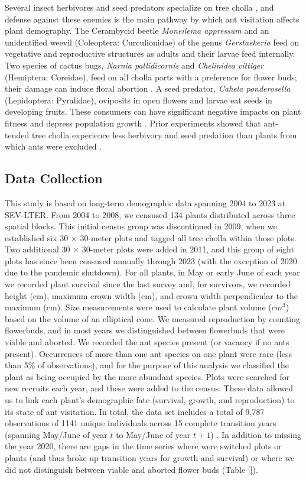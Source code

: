 \documentclass[11pt]{article}
\begin{document}
Several insect herbivores and seed predators specialize on tree cholla \citep{Mann1969}, and defense against these enemies is the main pathway by which ant visitation affects plant demography. 
The Cerambycid beetle \textit{Moneilema appressum} and an unidentified weevil (Coleoptera: Curculionidae) of the genus \textit{Gerstaekeria} feed on vegetative and reproductive structures as adults and their larvae feed internally. 
Two species of cactus bugs, \textit{Narnia pallidicornis} and \textit{Chelinidea vittiger} (Hemiptera: Coreidae), feed on all cholla parts with a preference for flower buds; their damage can induce floral abortion \citep{Miller2006}. 
A seed predator, \textit{Cahela ponderosella} (Lepidoptera: Pyralidae), oviposits in open flowers and larvae eat seeds in developing fruits. 
These consumers can have significant negative impacts on plant fitness and depress population growth \citep{Miller2009}.
Prior experiments showed that ant-tended tree cholla experience less herbivory and seed predation than plants from which ants were excluded \citep{Miller2007,Ohm2014}. 

\subsection*{Data Collection}
This study is based on long-term demographic data spanning 2004 to 2023 at SEV-LTER. 
From 2004 to 2008, we censused 134 plants distributed across three spatial blocks. 
This initial census group was discontinued in 2009, when we established six 30 $\times$ 30-meter plots and tagged all tree cholla within those plots. 
Two additional 30 $\times$ 30-meter plots were added in 2011, and this group of eight plots has since been censused annually through 2023 (with the exception of 2020 due to the pandemic shutdown). 
For all plants, in May or early June of each year we recorded plant survival since the last survey and, for survivors, we recorded height (cm), maximum crown width (cm), and crown width perpendicular to the maximum (cm).
Size measurements were used to calculate plant volume ($cm^3$) based on the volume of an elliptical cone. 
We measured reproduction by counting flowerbuds, and in most years we distinguished between flowerbuds that were viable and aborted. 
We recorded the ant species present (or vacancy if no ants present).
Occurrences of more than one ant species on one plant were rare (less than 5\% of observations), and for the purpose of this analysis we classified the plant as being occupied by the more abundant species. 
Plots were searched for new recruits each year, and these were added to the census.
These data allowed us to link each plant's demographic fate (survival, growth, and reproduction) to its state of ant visitation. 
In total, the data set includes a total of 9,787 observations of 1141 unique individuals across 15 complete transition years (spanning May/June of year $t$ to May/June of year $t+1$) \citep{DataCholla}. 
In addition to missing the year 2020, there are gaps in the time series where were switched plots or plants (and thus broke up transition years for growth and survival) or where we did not distinguish between viable and aborted flower buds (Table \ref{}). 
\end{document}
